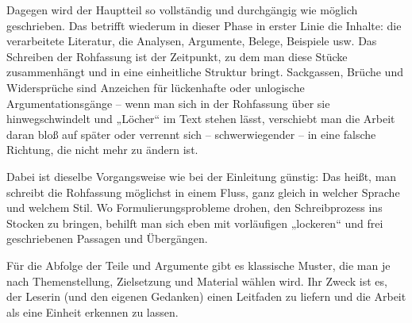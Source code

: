 \documentclass[]{book}
\theoremstyle{definition}
\theoremstyle{definition}
\theoremstyle{definition}
\theoremstyle{remark}
\begin{document}
Dagegen wird der Hauptteil so vollständig und durchgängig wie möglich
geschrieben. Das betrifft wiederum in dieser Phase in erster Linie die
Inhalte: die verarbeitete Literatur, die Analysen, Argumente, Belege,
Beispiele usw. Das Schreiben der Rohfassung ist der Zeitpunkt, zu dem
man diese Stücke zusammenhängt und in eine einheitliche Struktur bringt.
Sackgassen, Brüche und Widersprüche sind Anzeichen für lückenhafte oder
unlogische Argumentationsgänge -- wenn man sich in der Rohfassung über
sie hinwegschwindelt und „Löcher`` im Text stehen lässt, verschiebt man
die Arbeit daran bloß auf später oder verrennt sich -- schwerwiegender
-- in eine falsche Richtung, die nicht mehr zu ändern ist.

Dabei ist dieselbe Vorgangsweise wie bei der Einleitung günstig: Das
heißt, man schreibt die Rohfassung möglichst in einem Fluss, ganz gleich
in welcher Sprache und welchem Stil. Wo Formulierungsprobleme drohen,
den Schreibprozess ins Stocken zu bringen, behilft man sich eben mit
vorläufigen „lockeren`` und frei geschriebenen Passagen und Übergängen.

Für die Abfolge der Teile und Argumente gibt es klassische Muster, die
man je nach Themenstellung, Zielsetzung und Material wählen wird. Ihr
Zweck ist es, der Leserin (und den eigenen Gedanken) einen Leitfaden zu
liefern und die Arbeit als eine Einheit erkennen zu lassen.
\end{document}
